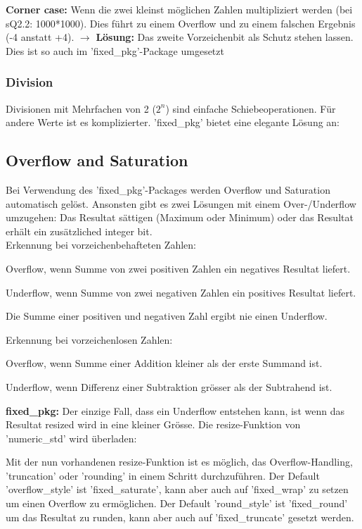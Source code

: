 
\textbf{Corner case:} Wenn die zwei kleinst möglichen Zahlen multipliziert werden (bei sQ2.2: 1000*1000). Dies führt zu einem Overflow und zu einem falschen Ergebnis (-4 anstatt +4). $\rightarrow$ \textbf{Lösung:} Das zweite Vorzeichenbit als Schutz stehen lassen. Dies ist so auch im 'fixed\_pkg'-Package umgesetzt

\subsubsection{Division}
Divisionen mit Mehrfachen von 2 ($2^n$) sind einfache Schiebeoperationen. Für andere Werte ist es komplizierter. 'fixed\_pkg' bietet eine elegante Lösung an:


\subsection{Overflow and Saturation}$~$ \\
Bei Verwendung des 'fixed\_pkg'-Packages werden Overflow und Saturation automatisch gelöst. Ansonsten gibt es zwei Lösungen mit einem Over-/Underflow umzugehen: Das Resultat sättigen (Maximum oder Minimum) oder das Resultat erhält ein zusätzliched integer bit.\\
Erkennung bei vorzeichenbehafteten Zahlen:
\begin{compactitem}
  \item Overflow, wenn Summe von zwei positiven Zahlen ein negatives Resultat liefert.
  \item Underflow, wenn Summe von zwei negativen Zahlen ein positives Resultat liefert.
  \item Die Summe einer positiven und negativen Zahl ergibt nie einen Underflow.
\end{compactitem}
Erkennung bei vorzeichenlosen Zahlen:
\begin{compactitem}
  \item Overflow, wenn Summe einer Addition kleiner als der erste Summand ist.
  \item Underflow, wenn Differenz einer Subtraktion grösser als der Subtrahend ist.
\end{compactitem}
\textbf{fixed\_pkg:} Der einzige Fall, dass ein Underflow entstehen kann, ist wenn das Resultat resized wird in eine kleiner Grösse. Die resize-Funktion von 'numeric\_std' wird überladen:

Mit der nun vorhandenen resize-Funktion ist es möglich, das Overflow-Handling, 'truncation' oder 'rounding' in einem Schritt durchzuführen. Der Default 'overflow\_style' ist 'fixed\_saturate', kann aber auch auf 'fixed\_wrap' zu setzen um einen Overflow zu ermöglichen. Der Default 'round\_style' ist 'fixed\_round' um das Resultat zu runden, kann aber auch auf 'fixed\_truncate' gesetzt werden.

